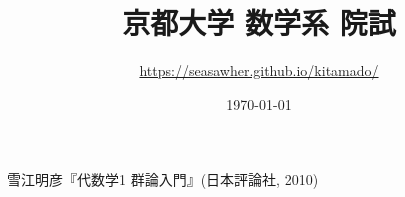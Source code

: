 \documentclass[10pt]{jsarticle}%
\begin{document}
\title{京都大学 数学系 院試}
\author{ \url{https://seasawher.github.io/kitamado/} }
\date{\today}
\maketitle

\tableofcontents%
\newpage



\newpage



\newpage




\newpage



\newpage



\newpage



\newpage



\newpage



\newpage



\newpage



\newpage



\newpage



\newpage

\begin{thebibliography}{1}%
   雪江明彦『代数学1 群論入門』(日本評論社, 2010)
\end{thebibliography}
\end{document}
